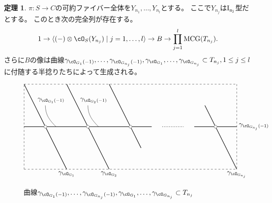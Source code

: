 \documentclass[uplatex,11pt,a4paper,dvipdfmx]{jsarticle}
\numberwithin{equation}{section}
\theoremstyle{definition}
\newtheorem{theorem}{定理}[section]
\DeclareMathOperator{\MCG}{\mathrm{MCG}}
\begin{document}
\begin{theorem}
    $\pi \colon S \to C$の可約ファイバー全体を$Y_{n_1}, \dots, Y_{n_l}$とする。
    ここで$Y_{n_j}$は$\rm{I}_{n_j}$型だとする。
    このとき次の完全列が存在する。
    \begin{equation}
        1 \to \langle (-)\otimes \cO_S(Y_{n_j}) \mid j = 1, \dots, l\rangle \to B \to \prod_{j=1}^l \MCG(T_{n_j}).
    \end{equation}
    さらに$B$の像は曲線$\gamma_{\cO_{G_1}(-1)}, \dots, \gamma_{\cO_{G_{n_j}}(-1)}, \gamma_{\cO_{G_1}}, \dots, \gamma_{\cO_{G_{n_j}}} \subset T_{n_j}, 1\leq j \leq l$に付随する半捻りたちによって生成される。
    \begin{figure}[h]
        \centering
        \begin{displaymath}
            \begin{tikzpicture}[scale=1.2]
                \draw[dashed] (0,0)--(10,0);
                \draw[dashed] (0,0)--(0,4);
                \draw[dashed] (0,4)--(10,4);
                \draw[dashed] (10,4)--(10,0);

                \draw[thick] (0, 2)--(1, 2);
                \draw[thick] (1, 2)--(3, 2);
                \draw[thick] (3, 2)--(5, 2);
                \draw[thick] (5, 2)--(6, 2);
                \draw[thick] (8, 2)--(9, 2);
                \draw[thick] (9, 2)--(10, 2);


                \draw[thick] (0, 4)--(1, 2);
                \draw[thick] (1, 2)--(2, 0);
                \draw[thick] (2, 4)--(4, 0);
                \draw[thick] (4, 4)--(5, 2);
                \draw[thick] (5, 2)--(5.5, 1);
                \draw[thick] (8.5, 3)--(9, 2);
                \draw[thick] (9, 2)--(10, 0);

                \draw[dotted, thick] (5+1.5, 2)--(9-1.5, 2);
                \foreach \u in {1, 3, 5, 9}
                    {
                        \filldraw[white] (\u, 2) circle (2pt);
                        \draw[black] (\u, 2) circle (2pt);
                    }

                \draw(2, 0) node[below]{$\gamma_{\cO_{G_1}}$};
                \draw(4, 0) node[below]{$\gamma_{\cO_{G_2}}$};
                \draw(10, 0) node[below]{$\gamma_{\cO_{G_{n_j}}}$};

                \draw(2, 3) node[above left]{$\gamma_{\cO_{G_1}(-1)}$};
                \draw(1, 3) to[out=-90,in=135](1.5, 2);
                \draw(4, 3) node[above left]{$\gamma_{\cO_{G_2}(-1)}$};
                \draw(3, 3) to[out=-90,in=135](3.5, 2);

                \draw(10, 2) node[right]{$\gamma_{\cO_{G_{n_j}}(-1)}$};

            \end{tikzpicture}
        \end{displaymath}
        \caption{曲線$\gamma_{\cO_{G_1}(-1)}, \dots, \gamma_{\cO_{G_{n_j}}(-1)}, \gamma_{\cO_{G_1}}, \dots, \gamma_{\cO_{G_{n_j}}} \subset T_{n_j}$}
    \end{figure}
\end{theorem}
\end{document}
